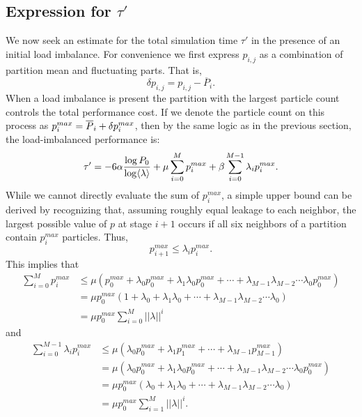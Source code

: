 \subsection{Expression for \texorpdfstring{$\tau'$}{tau'}}

We now seek an estimate for the total simulation time $\tau'$ in the presence of
an initial load imbalance. For convenience we first express $p_{i,j}$ as a
combination of partition mean and fluctuating parts. That is,
\begin{equation}
  \label{eq:mean}
  \delta p_{i,j} = p_{i,j} - \overline{P}_i.
\end{equation}
When a load imbalance is present the partition with the largest particle count
controls the total performance cost. If we denote the particle count on this
process as $p^{max}_i = \overline{P}_i + \delta{p_i^{max}}$, then by the same logic as in
the previous section, the load-imbalanced performance is:
\begin{equation}
  \label{eq:tauprime-1}
  \tau' = -6 \alpha \frac{\log P_0}{\log \langle \lambda \rangle} + \mu \sum_{i=0}^M p_i^{max} +
  \beta \sum_{i=0}^{M-1} \lambda_i p_i^{max}.
\end{equation}
While we cannot directly evaluate the sum of $p_i^{max}$, a simple upper bound
can be derived by recognizing that, assuming roughly equal leakage to each
neighbor, the largest possible value of $p$ at stage $i+1$ occurs if all six
neighbors of a partition contain $p_i^{max}$ particles. Thus,
\begin{equation}
  \label{eq:pmax-ub1}
  p^{max}_{i+1} \le \lambda_i p^{max}_i.
\end{equation}
This implies that
\begin{align}
  \label{eq:pmax-expand1}
  \sum_{i=0}^M p_i^{max} &\le \mu \left ( p_0^{max} + \lambda_0 p_0^{max} +
  \lambda_1 \lambda_0 p_0^{max} + \dotsb + \lambda_{M-1} \lambda_{M-2} \dotsm
  \lambda_0 p_0^{max} \right ) \nonumber \\
  &= \mu p_0^{max} \left ( 1 + \lambda_0 + \lambda_1 \lambda_0 + \dotsb +
  \lambda_{M-1} \lambda_{M-2} \dotsm \lambda_0 \right ) \nonumber \\
  &= \mu p_0^{max} \sum_{i=0}^M ||\lambda||^i
\end{align}
and
\begin{align}
  \label{eq:pmax-expand2}
  \sum_{i=0}^{M-1} \lambda_i p_i^{max} &\le \mu \left ( \lambda_0 p_0^{max} +
  \lambda_1 p_1^{max} + \dotsb + \lambda_{M-1} p_{M-1}^{max} \right ) \nonumber \\
  &= \mu \left ( \lambda_0 p_0^{max} + \lambda_1 \lambda_0 p_0^{max} + \dotsb +
  \lambda_{M-1} \lambda_{M-2} \dotsm \lambda_0 p_0^{max} \right ) \nonumber \\
  &= \mu p_0^{max} \left ( \lambda_0 + \lambda_1 \lambda_0 + \dotsb +
  \lambda_{M-1} \lambda_{M-2} \dotsm \lambda_0 \right ) \nonumber \\
  &= \mu p_0^{max} \sum_{i=1}^M ||\lambda||^i.
\end{align}
